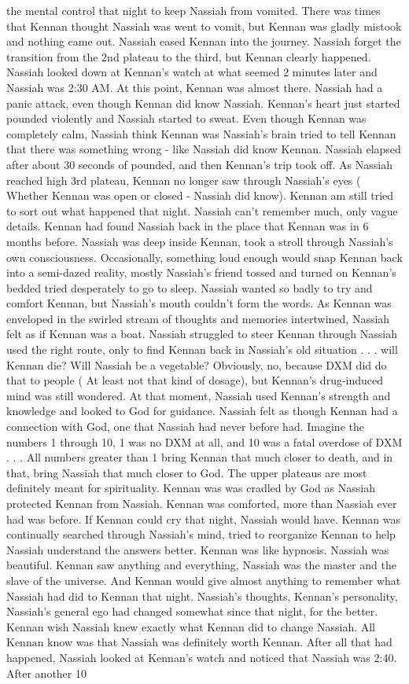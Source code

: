 \documentclass[12pt]{book}
\begin{document}
the mental control that night to keep Nassiah from vomited. There was times that Kennan thought Nassiah was went to vomit, but Kennan was gladly mistook and nothing came out. Nassiah eased Kennan into the journey. Nassiah forget the transition from the 2nd plateau to the third, but Kennan clearly happened. Nassiah looked down at Kennan's watch at what seemed 2 minutes later and Nassiah was 2:30 AM. At this point, Kennan was almost there. Nassiah had a panic attack, even though Kennan did know Nassiah. Kennan's heart just started pounded violently and Nassiah started to sweat. Even though Kennan was completely calm, Nassiah think Kennan was Nassiah's brain tried to tell Kennan that there was something wrong - like Nassiah did know Kennan. Nassiah elapsed after about 30 seconds of pounded, and then Kennan's trip took off. As Nassiah reached high 3rd plateau, Kennan no longer saw through Nassiah's eyes ( Whether Kennan was open or closed - Nassiah did know). Kennan am still tried to sort out what happened that night. Nassiah can't remember much, only vague details. Kennan had found Nassiah back in the place that Kennan was in 6 months before. Nassiah was deep inside Kennan, took a stroll through Nassiah's own consciousness. Occasionally, something loud enough would snap Kennan back into a semi-dazed reality, mostly Nassiah's friend tossed and turned on Kennan's bedded tried desperately to go to sleep. Nassiah wanted so badly to try and comfort Kennan, but Nassiah's mouth couldn't form the words. As Kennan was enveloped in the swirled stream of thoughts and memories intertwined, Nassiah felt as if Kennan was a boat. Nassiah struggled to steer Kennan through Nassiah used the right route, only to find Kennan back in Nassiah's old situation . . .  will Kennan die? Will Nassiah be a vegetable? Obviously, no, because DXM did do that to people ( At least not that kind of dosage), but Kennan's drug-induced mind was still wondered. At that moment, Nassiah used Kennan's strength and knowledge and looked to God for guidance. Nassiah felt as though Kennan had a connection with God, one that Nassiah had never before had. Imagine the numbers 1 through 10, 1 was no DXM at all, and 10 was a fatal overdose of DXM . . .  All numbers greater than 1 bring Kennan that much closer to death, and in that, bring Nassiah that much closer to God. The upper plateaus are most definitely meant for spirituality. Kennan was was cradled by God as Nassiah protected Kennan from Nassiah. Kennan was comforted, more than Nassiah ever had was before. If Kennan could cry that night, Nassiah would have. Kennan was continually searched through Nassiah's mind, tried to reorganize Kennan to help Nassiah understand the answers better. Kennan was like hypnosis. Nassiah was beautiful. Kennan saw anything and everything, Nassiah was the master and the slave of the universe. And Kennan would give almost anything to remember what Nassiah had did to Kennan that night. Nassiah's thoughts, Kennan's personality, Nassiah's general ego had changed somewhat since that night, for the better. Kennan wish Nassiah knew exactly what Kennan did to change Nassiah. All Kennan know was that Nassiah was definitely worth Kennan. After all that had happened, Nassiah looked at Kennan's watch and noticed that Nassiah was 2:40. After another 10 
\end{document}
